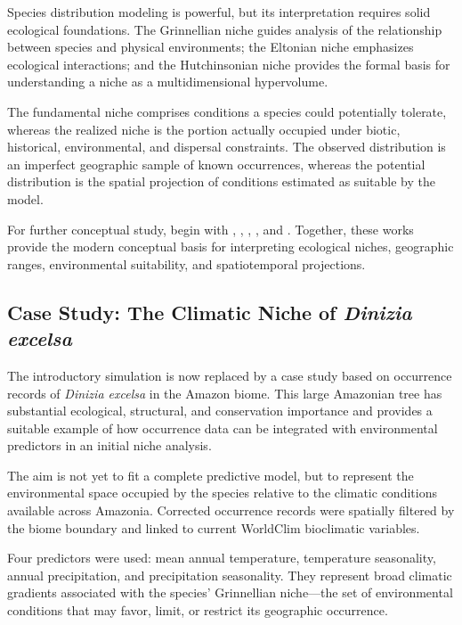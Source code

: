 Species distribution modeling is powerful, but its interpretation requires
solid ecological foundations. The Grinnellian niche guides analysis of the
relationship between species and physical environments; the Eltonian niche
emphasizes ecological interactions; and the Hutchinsonian niche provides the
formal basis for understanding a niche as a multidimensional hypervolume.

The fundamental niche comprises conditions a species could potentially
tolerate, whereas the realized niche is the portion actually occupied under
biotic, historical, environmental, and dispersal constraints. The observed
distribution is an imperfect geographic sample of known occurrences, whereas
the potential distribution is the spatial projection of conditions estimated
as suitable by the model.

\begin{leitura}
For further conceptual study, begin with \textcite{guisan2005predicting},
\textcite{soberon2007}, \textcite{soberon2009}, \textcite{peterson2011}, and
\textcite{guisan2017habitat}. Together, these works provide the modern
conceptual basis for interpreting ecological niches, geographic ranges,
environmental suitability, and spatiotemporal projections.
\end{leitura}

\subsection{Case Study: The Climatic Niche of \textit{Dinizia excelsa}}

The introductory simulation is now replaced by a case study based on occurrence
records of \textit{Dinizia excelsa} in the Amazon biome. This large Amazonian
tree has substantial ecological, structural, and conservation importance and
provides a suitable example of how occurrence data can be integrated with
environmental predictors in an initial niche analysis.

The aim is not yet to fit a complete predictive model, but to represent the
environmental space occupied by the species relative to the climatic conditions
available across Amazonia. Corrected occurrence records were spatially filtered
by the biome boundary and linked to current WorldClim bioclimatic variables.

Four predictors were used: mean annual temperature, temperature seasonality,
annual precipitation, and precipitation seasonality. They represent broad
climatic gradients associated with the species' Grinnellian niche---the set of
environmental conditions that may favor, limit, or restrict its geographic
occurrence.

